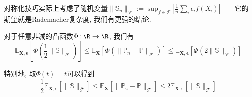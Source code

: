 对称化技巧实际上考虑了随机变量$\|\mathbb{S}_n\|_{\mathscr{F}} := \sup_{f \in \mathscr{F}} \left| \frac{1}{n} \sum_i \epsilon_i f(X_i) \right|$——它的期望就是Rademacher复杂度, 我们有更强的结论. 
\begin{proposition}
	对于任意非减的凸函数$\Phi \colon \R \to \R$, 我们有
	\begin{equation*}
		\mathbb{E}_{\bm{X}, \bm{\epsilon}} \left[ \Phi\left(\frac{1}{2} \|\mathbb{S}\|_{\bar{\mathscr{F}}} \right)\right]
		\leq \mathbb{E}_{\bm{X}} \left[ \Phi\left(\|\mathbb{P}_n - \mathbb{P}\|_{\mathscr{F}}\right)\right]
		\leq \mathbb{E}_{\bm{X}, \bm{\epsilon}} \left[ \Phi\left(2 \|\mathbb{S}\|_{\mathscr{F}} \right)\right]
	\end{equation*}	
\end{proposition}
\begin{remark}
	特别地, 取$\Phi(t) = t$可以得到
	\begin{equation}\label{eq:SandwichedByRC}
		\frac{1}{2} \mathbb{E}_{\bm{X}, \bm{\epsilon}} \left[\|\mathbb{S}\|_{\bar{\mathscr{F}}}\right] 
		\leq \mathbb{E}_{\bm{X}} \left[ \|\mathbb{P}_n - \mathbb{P}\|_{\mathscr{F}} \right] 
		\leq 2 \mathbb{E}_{\bm{X}, \bm{\epsilon}} \left[ \|\mathbb{S}\|_{\mathscr{F}} \right] 
	\end{equation}
\end{remark}
